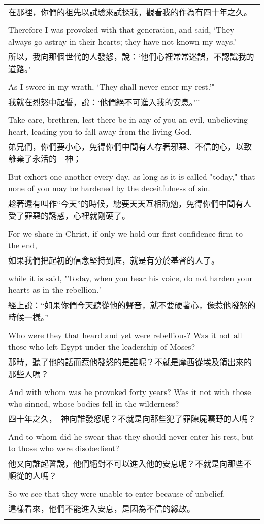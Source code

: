 \documentclass{book}
\begin{document}
\begin{tabularx}{\textwidth}{p{}}
在那裡，你們的祖先以試驗來試探我，觀看我的作為有四十年之久。 \\ \\
Therefore I was provoked with that generation, and said, `They always go astray in their hearts; they have not known my ways.' \\
所以，我向那個世代的人發怒，說：‘他們心裡常常迷誤，不認識我的道路。’ \\ \\
As I swore in my wrath, `They shall never enter my rest.'" \\
我就在烈怒中起誓，說：‘他們絕不可進入我的安息。’” \\ \\
Take care, brethren, lest there be in any of you an evil, unbelieving heart, leading you to fall away from the living God. \\
弟兄們，你們要小心，免得你們中間有人存著邪惡、不信的心，以致離棄了永活的　神； \\ \\
But exhort one another every day, as long as it is called "today," that none of you may be hardened by the deceitfulness of sin. \\
趁著還有叫作“今天”的時候，總要天天互相勸勉，免得你們中間有人受了罪惡的誘惑，心裡就剛硬了。 \\ \\
For we share in Christ, if only we hold our first confidence firm to the end, \\
如果我們把起初的信念堅持到底，就是有分於基督的人了。 \\ \\
while it is said, "Today, when you hear his voice, do not harden your hearts as in the rebellion." \\
經上說：“如果你們今天聽從他的聲音，就不要硬著心，像惹他發怒的時候一樣。” \\ \\
Who were they that heard and yet were rebellious? Was it not all those who left Egypt under the leadership of Moses? \\
那時，聽了他的話而惹他發怒的是誰呢？不就是摩西從埃及領出來的那些人嗎？ \\ \\
And with whom was he provoked forty years? Was it not with those who sinned, whose bodies fell in the wilderness? \\
四十年之久，　神向誰發怒呢？不就是向那些犯了罪陳屍曠野的人嗎？ \\ \\
And to whom did he swear that they should never enter his rest, but to those who were disobedient? \\
他又向誰起誓說，他們絕對不可以進入他的安息呢？不就是向那些不順從的人嗎？ \\ \\
So we see that they were unable to enter because of unbelief. \\
這樣看來，他們不能進入安息，是因為不信的緣故。 \\ \\

\hline
\end{tabularx}
\end{document}
